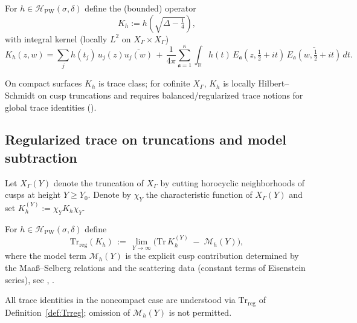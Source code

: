 \begin{definition}
\label{def:spectral-kernel}
For $h\in \mathcal{H}_{\mathrm{PW}}(\sigma,\delta)$ define the (bounded) operator
\[
  K_h := h\!\left(\sqrt{\Delta-\tfrac14}\right),
\]
with integral kernel (locally $L^2$ on $X_\Gamma\times X_\Gamma$)
\[
  K_h(z,w) = \sum_{j} h(t_j)\, u_j(z)\overline{u_j(w)} \,+\, \frac{1}{4\pi}\sum_{\mathfrak a=1}^{\kappa}\int_{\mathbb{R}} h(t)\,E_{\mathfrak a}(z,\tfrac12+it)\,\overline{E_{\mathfrak a}(w,\tfrac12+it)}\,dt.
\]
\end{definition}

\begin{remark}
\label{rem:trace-vs-locHS}
On compact surfaces $K_h$ is trace class; for cofinite $X_\Gamma$, $K_h$ is locally Hilbert–Schmidt on cusp truncations and requires balanced/regularized trace notions for global trace identities (\cite{Hejhal1983vol2,Borthwick2020}). \relax
\end{remark}

\subsection{Regularized trace on truncations and model subtraction} %
\label{subsec:ch4-part1-regularized-trace} \relax

\begin{definition}
\label{def:truncation}
Let $X_\Gamma(Y)$ denote the truncation of $X_\Gamma$ by cutting horocyclic neighborhoods of cusps at height $Y\ge Y_0$. Denote by $\chi_{Y}$ the characteristic function of $X_\Gamma(Y)$ and set $K_h^{(Y)}:=\chi_Y K_h \chi_Y$.
\end{definition}

\begin{definition}
\label{def:Trreg}
For $h\in\mathcal{H}_{\mathrm{PW}}(\sigma,\delta)$ define
\[
  \mathrm{Tr}_{\mathrm{reg}}(K_h)
  \,:=\, \lim_{Y\to \infty}\Big( \mathrm{Tr}\,K_h^{(Y)} \;-\; \mathcal{M}_h(Y)\Big),
\]
where the model term $\mathcal{M}_h(Y)$ is the explicit cusp contribution determined by the Maaß–Selberg relations and the scattering data (constant terms of Eisenstein series), see \cite[§§3–4]{Hejhal1983vol2}, \cite[Ch.~3]{Borthwick2020}. \relax
\end{definition}

\begin{invariant}
\label{inv:C12}
All trace identities in the noncompact case are understood via $\mathrm{Tr}_{\mathrm{reg}}$ of Definition~\ref{def:Trreg}; omission of $\mathcal{M}_h(Y)$ is not permitted. \relax
\end{invariant}

